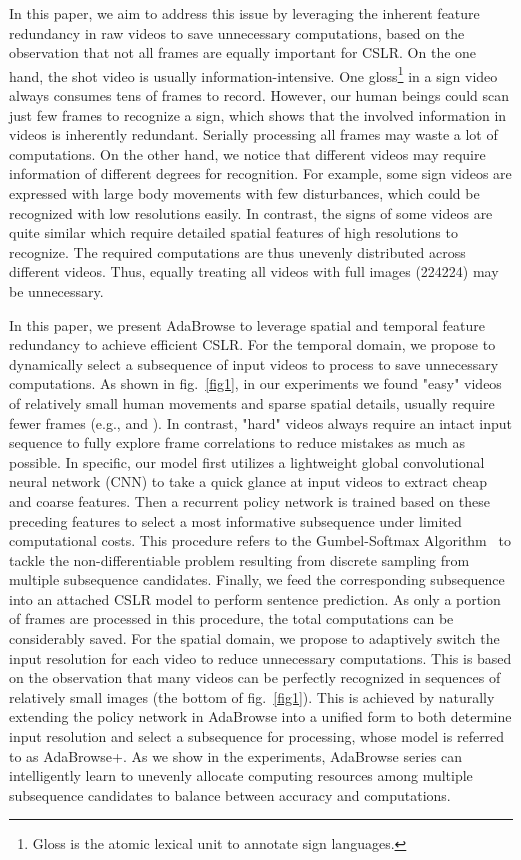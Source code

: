 \documentclass[sigconf]{acmart}
\begin{document}
In this paper, we aim to address this issue by leveraging the inherent feature redundancy in raw videos to save unnecessary computations, based on the observation that not all frames are equally important for CSLR. On the one hand, the shot video is usually information-intensive. One gloss\footnote{Gloss is the atomic lexical unit to annotate sign languages.} in a sign video always consumes tens of frames to record. However, our human beings could scan just few frames to recognize a sign, which shows that the involved information in videos is inherently redundant. Serially processing all frames may waste a lot of computations. On the other hand, we notice that different videos may require information of different degrees for recognition. For example, some sign videos are expressed with large body movements with few disturbances, which could be recognized with low resolutions easily. In contrast, the signs of some videos are quite similar which require detailed spatial features of high resolutions to recognize. The required computations are thus unevenly distributed across different videos. Thus, equally treating all videos with full images (224224) may be unnecessary.


In this paper, we present AdaBrowse to leverage spatial and temporal feature redundancy to achieve efficient CSLR. For the temporal domain, we propose to dynamically select a subsequence of input videos to process to save unnecessary computations. As shown in fig.~\ref{fig1}, in our experiments we found "easy" videos of relatively small human movements and sparse spatial details, usually require fewer frames (e.g.,  and ). In contrast, "hard" videos always require an intact input sequence to fully explore frame correlations to reduce mistakes as much as possible. In specific, our model first utilizes a lightweight global convolutional neural network (CNN) to take a quick glance at input videos to extract cheap and coarse features. Then a recurrent policy network is trained based on these preceding features to select a most informative subsequence under limited computational costs. This procedure refers to the Gumbel-Softmax Algorithm~\cite{jang2016categorical} to tackle the non-differentiable problem resulting from discrete sampling from multiple subsequence candidates. Finally, we feed the corresponding subsequence into an attached CSLR model to perform sentence prediction. As only a portion of frames are processed in this procedure, the total computations can be considerably saved. For the spatial domain, we propose to adaptively switch the input resolution for each video to reduce unnecessary computations. This is based on the observation that many videos can be perfectly recognized in sequences of relatively small images (the bottom of fig.~\ref{fig1}). This is achieved by naturally extending the policy network in AdaBrowse into a unified form to both determine input resolution and select a subsequence for processing, whose model is referred to as AdaBrowse+. As we show in the experiments, AdaBrowse series can intelligently learn to unevenly allocate computing resources among multiple subsequence candidates to balance between accuracy and computations.
  
\end{document}
